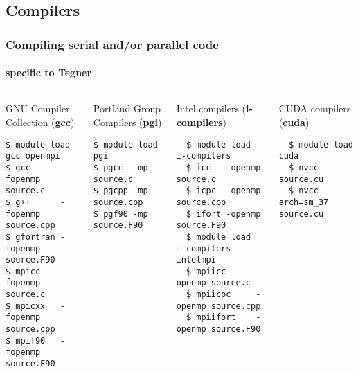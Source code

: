 \subsection{Compilers}
\begin{frame}[fragile]
\frametitle{Compiling serial and/or parallel code}
\framesubtitle{specific to \alert{Tegner}}

\begin{columns}[t]
\begin{exampleblock}{GNU Compiler Collection (\textbf{gcc})}
  \scriptsize
  \begin{verbatim}
$ module load 	gcc openmpi
$ gcc	   -fopenmp source.c
$ g++	   -fopenmp source.cpp
$ gfortran -fopenmp source.F90
$ mpicc	   -fopenmp source.c
$ mpicxx   -fopenmp source.cpp
$ mpif90   -fopenmp source.F90
  \end{verbatim}
  \end{exampleblock}

  \begin{exampleblock}{Portland Group Compilers (\textbf{pgi}) }
  \scriptsize
  \begin{verbatim}
$ module load 	pgi
$ pgcc  -mp source.c
$ pgcpp -mp source.cpp
$ pgf90 -mp source.F90
  \end{verbatim}
  \end{exampleblock}


  \begin{exampleblock}{Intel compilers (\textbf{i-compilers})}
  \scriptsize
  \begin{verbatim}
  $ module load i-compilers
  $ icc   -openmp source.c	
  $ icpc  -openmp source.cpp
  $ ifort -openmp source.F90
  $ module load i-compilers intelmpi
  $ mpiicc 	-openmp source.c
  $ mpiicpc 	-openmp source.cpp
  $ mpiifort 	-openmp source.F90
  \end{verbatim}
  \end{exampleblock}

  \begin{exampleblock}{CUDA compilers (\textbf{cuda})}
  \scriptsize
  \begin{verbatim}
  $ module load cuda
  $ nvcc source.cu
  $ nvcc -arch=sm_37  source.cu
  \end{verbatim}
  \end{exampleblock}

\end{columns}
\end{frame}


